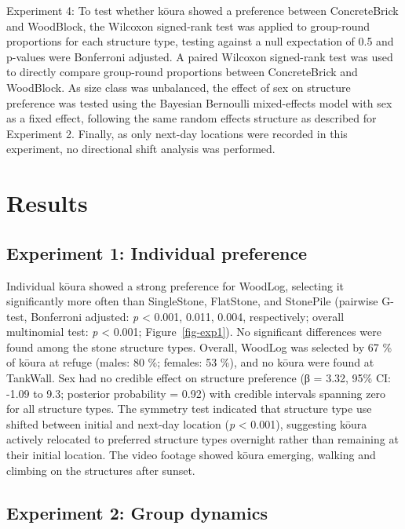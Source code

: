 \documentclass[
  12pt,
  a4paper,
]{scrbook}
\begin{document}
Experiment 4: To test whether kōura showed a preference between
ConcreteBrick and WoodBlock, the Wilcoxon signed-rank test was applied
to group-round proportions for each structure type, testing against a
null expectation of 0.5 and p-values were Bonferroni adjusted. A paired
Wilcoxon signed-rank test was used to directly compare group-round
proportions between ConcreteBrick and WoodBlock. As size class was
unbalanced, the effect of sex on structure preference was tested using
the Bayesian Bernoulli mixed-effects model with sex as a fixed effect,
following the same random effects structure as described for Experiment
2. Finally, as only next-day locations were recorded in this experiment,
no directional shift analysis was performed.


\chapter{Results}\label{results-2}

\section{Experiment 1: Individual
preference}\label{experiment-1-individual-preference-1}

Individual kōura showed a strong preference for WoodLog, selecting it
significantly more often than SingleStone, FlatStone, and StonePile
(pairwise G-test, Bonferroni adjusted: \emph{p} \textless{} 0.001,
0.011, 0.004, respectively; overall multinomial test: \emph{p}
\textless{} 0.001; Figure~\ref{fig-exp1}). No significant differences
were found among the stone structure types. Overall, WoodLog was
selected by 67 \% of kōura at refuge (males: 80 \%; females: 53 \%), and
no kōura were found at TankWall. Sex had no credible effect on structure
preference (β = 3.32, 95\% CI: -1.09 to 9.3; posterior probability =
0.92) with credible intervals spanning zero for all structure types. The
symmetry test indicated that structure type use shifted between initial
and next-day location (\emph{p} \textless{} 0.001), suggesting kōura
actively relocated to preferred structure types overnight rather than
remaining at their initial location. The video footage showed kōura
emerging, walking and climbing on the structures after sunset.

\section{Experiment 2: Group
dynamics}\label{experiment-2-group-dynamics-1}
\end{document}
